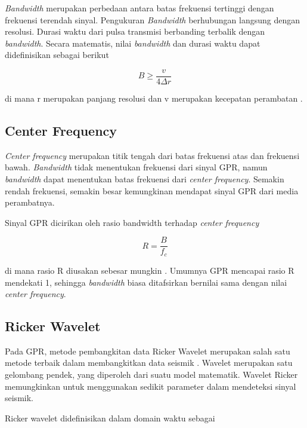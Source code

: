 \emph{Bandwidth} merupakan perbedaan antara batas frekuensi tertinggi dengan frekuensi terendah sinyal. 
Pengukuran \emph{Bandwidth} berhubungan langsung dengan resolusi. 
Durasi waktu dari pulsa transmisi berbanding terbalik dengan \emph{bandwidth}. 
Secara matematis, nilai \emph{bandwidth} dan durasi waktu dapat didefinisikan sebagai berikut

\begin{equation}
  \label{eq:BW}
  B \geq  \frac{v}{4 \Delta r} 
\end{equation}

di mana r merupakan panjang resolusi dan v merupakan kecepatan perambatan \parencite{jol2008ground}.

\subsection{Center Frequency}
\label{subsec:centerFrequency}

\emph{Center frequency} merupakan titik tengah dari batas frekuensi atas dan frekuensi bawah. 
\emph{Bandwidth} tidak menentukan frekuensi dari sinyal GPR, namun \emph{bandwidth} dapat menentukan batas frekuensi dari \emph{center frequency}.
Semakin rendah frekuensi, semakin besar kemungkinan mendapat sinyal GPR dari media perambatnya.

Sinyal GPR dicirikan oleh rasio bandwidth terhadap \emph{center frequency}

\begin{equation}
  \label{eq:cF}
  R =  \frac{B}{ f_{c} } 
\end{equation}

di mana rasio R diusakan sebesar mungkin \parencite{jol2008ground}. 
Umumnya GPR mencapai rasio R mendekati 1, sehingga \emph{bandwidth} biasa ditafsirkan bernilai sama dengan nilai \emph{center frequency}.

\subsection{Ricker Wavelet}
\label{subsec:rickerWavelet}

Pada GPR, metode pembangkitan data Ricker Wavelet merupakan salah satu metode terbaik dalam membangkitkan data seismik \parencite{rickeronSeismic}. 
Wavelet merupakan satu gelombang pendek, yang diperoleh dari suatu model matematik. 
Wavelet Ricker memungkinkan untuk menggunakan sedikit parameter dalam mendeteksi sinyal seismik.

Ricker wavelet didefinisikan dalam domain waktu sebagai

